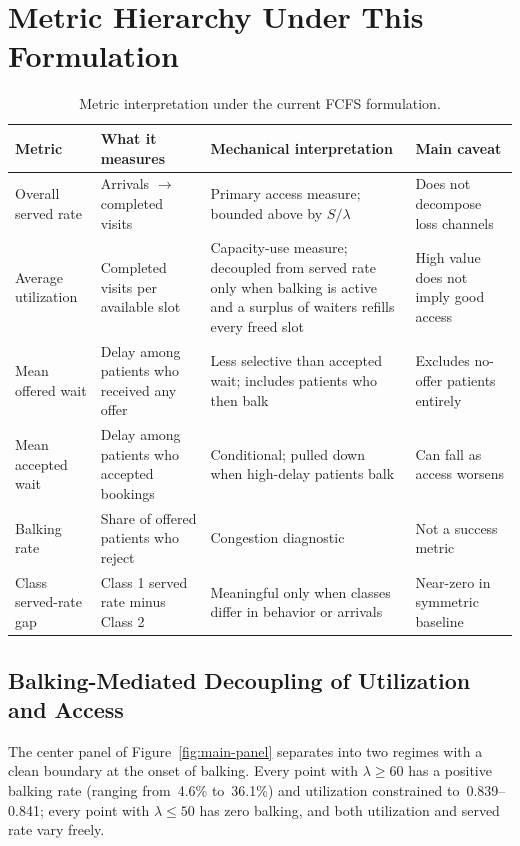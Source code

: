 \documentclass[11pt]{article}
\begin{document}
\section{Metric Hierarchy Under This Formulation}
\label{sec:metrics}

\begin{table}[H]
\centering
\renewcommand{\arraystretch}{1.2}
\begin{tabular}{p{}p{}p{}p{}}
\toprule
Metric & What it measures & Mechanical interpretation & Main caveat \\
\midrule
Overall served rate & Arrivals $\to$ completed visits & Primary access measure; bounded above by $S/\lambda$ & Does not decompose loss channels \\
Average utilization & Completed visits per available slot & Capacity-use measure; decoupled from served rate only when balking is active and a surplus of waiters refills every freed slot & High value does not imply good access \\
Mean offered wait & Delay among patients who received any offer & Less selective than accepted wait; includes patients who then balk & Excludes no-offer patients entirely \\
Mean accepted wait & Delay among patients who accepted bookings & Conditional; pulled down when high-delay patients balk & Can fall as access worsens \\
Balking rate & Share of offered patients who reject & Congestion diagnostic & Not a success metric \\
Class served-rate gap & Class 1 served rate minus Class 2 & Meaningful only when classes differ in behavior or arrivals & Near-zero in symmetric baseline \\
\bottomrule
\end{tabular}
\caption{Metric interpretation under the current FCFS formulation.}
\label{tab:metrics}
\end{table}

\subsection{Balking-Mediated Decoupling of Utilization and Access}

The center panel of Figure~\ref{fig:main-panel} separates into two regimes
with a clean boundary at the onset of balking. Every point with $\lambda \geq
60$ has a positive balking rate (ranging from~4.6\% to~36.1\%) and
utilization constrained to~0.839--0.841; every point with $\lambda \leq 50$
has zero balking, and both utilization and served rate vary freely.
\end{document}
